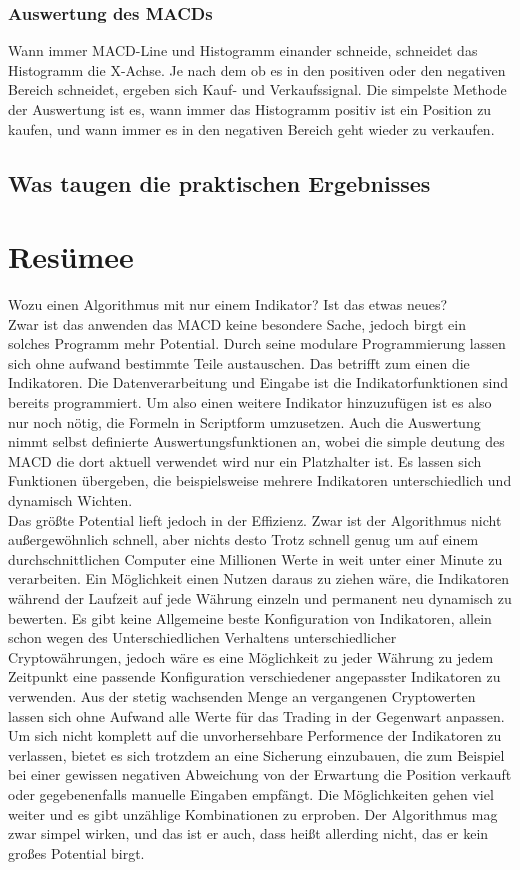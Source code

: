 \documentclass[12pt]{article}
\begin{document}
	\subsubsection{Auswertung des MACDs}
		Wann immer MACD-Line und Histogramm einander schneide, schneidet das Histogramm die X-Achse. Je nach dem ob es in den positiven oder den negativen Bereich schneidet, ergeben sich Kauf- und Verkaufssignal. Die simpelste Methode der Auswertung ist es, wann immer das Histogramm positiv ist ein Position zu kaufen, und wann immer es in den negativen Bereich geht wieder zu verkaufen.


\subsection{Was taugen die praktischen Ergebnisses}
\section{Resümee}
	Wozu einen Algorithmus mit nur einem Indikator? Ist das etwas neues?\\
	Zwar ist das anwenden das MACD keine besondere Sache, jedoch birgt ein solches Programm mehr Potential. Durch seine modulare Programmierung lassen sich ohne aufwand bestimmte Teile austauschen. Das betrifft zum einen die Indikatoren. Die Datenverarbeitung und Eingabe ist die Indikatorfunktionen sind bereits programmiert. Um also einen weitere Indikator hinzuzufügen ist es also nur noch nötig, die Formeln in Scriptform umzusetzen. Auch die Auswertung nimmt selbst definierte Auswertungsfunktionen an, wobei die simple deutung des MACD die dort aktuell verwendet wird nur ein Platzhalter ist. Es lassen sich Funktionen übergeben, die beispielsweise mehrere Indikatoren unterschiedlich und dynamisch Wichten.\\
	Das größte Potential lieft jedoch in der Effizienz. Zwar ist der Algorithmus nicht außergewöhnlich schnell, aber nichts desto Trotz schnell genug um auf einem durchschnittlichen Computer eine Millionen Werte in weit unter einer Minute zu verarbeiten. Ein Möglichkeit einen Nutzen daraus zu ziehen wäre, die Indikatoren während der Laufzeit auf jede Währung einzeln und permanent neu dynamisch zu bewerten. Es gibt keine Allgemeine beste Konfiguration von Indikatoren, allein schon wegen des Unterschiedlichen Verhaltens unterschiedlicher Cryptowährungen, jedoch wäre es eine Möglichkeit zu jeder Währung zu jedem Zeitpunkt eine passende Konfiguration verschiedener angepasster Indikatoren zu verwenden. Aus der stetig wachsenden Menge an vergangenen Cryptowerten lassen sich ohne Aufwand alle Werte für das Trading in der Gegenwart anpassen.\\
	Um sich nicht komplett auf die unvorhersehbare Performence der Indikatoren zu verlassen, bietet es sich trotzdem an eine Sicherung einzubauen, die zum Beispiel bei einer gewissen negativen Abweichung von der Erwartung die Position verkauft oder gegebenenfalls manuelle Eingaben empfängt. Die Möglichkeiten gehen viel weiter und es gibt unzählige Kombinationen zu erproben. Der Algorithmus mag zwar simpel wirken, und das ist er auch, dass heißt allerding nicht, das er kein großes Potential birgt.
\end{document}
